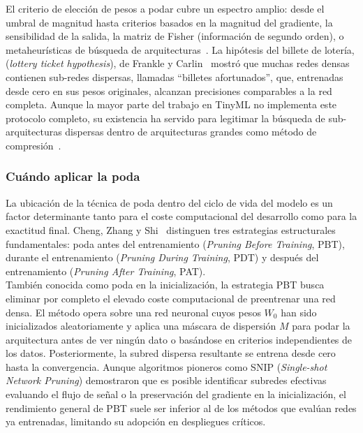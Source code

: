 \documentclass[a4paper,12pt,twoside,final]{book}
\begin{document}
El criterio de elección de pesos a podar cubre un espectro amplio: desde el umbral de magnitud hasta criterios
basados en la magnitud del gradiente, la sensibilidad de la salida, la matriz de Fisher (información de segundo
orden), o metaheurísticas de búsqueda de arquitecturas~\cite{liang2021neucom,cheng2024ieetpami}. La hipótesis del
billete de lotería, (\textit{lottery ticket hypothesis}), de Frankle y Carlin~\cite{frankle2019iclr} mostró que
muchas redes densas contienen sub-redes dispersas, llamadas ``billetes afortunados'', que, entrenadas desde cero en sus
pesos originales, alcanzan precisiones comparables a la red completa. Aunque la mayor parte del trabajo en TinyML no
implementa este protocolo completo, su existencia ha servido para legitimar la búsqueda de sub-arquitecturas
dispersas dentro de arquitecturas grandes como método de compresión~\cite{cheng2024ieetpami}.

\subsubsection{Cuándo aplicar la poda}
La ubicación de la técnica de poda dentro del ciclo de vida del modelo es un factor determinante tanto para el coste
computacional del desarrollo como para la exactitud final. Cheng, Zhang y Shi~\cite{cheng2024ieetpami} distinguen
tres estrategias estructurales fundamentales: poda antes del entrenamiento (\textit{Pruning Before Training}, PBT),
durante el entrenamiento (\textit{Pruning During Training}, PDT) y después del entrenamiento (\textit{Pruning After
Training}, PAT).\\

También conocida como poda en la inicialización, la estrategia PBT busca eliminar por completo el elevado coste
computacional de preentrenar una red densa. El método opera sobre una red neuronal cuyos pesos $W_0$ han sido
inicializados aleatoriamente y aplica una máscara de dispersión $M$ para podar la arquitectura antes de ver ningún
dato o basándose en criterios independientes de los datos. Posteriormente, la subred dispersa resultante se entrena
desde cero hasta la convergencia. Aunque algoritmos pioneros como SNIP (\textit{Single-shot Network Pruning})
demostraron que es posible identificar subredes efectivas evaluando el flujo de señal o la preservación del gradiente
en la inicialización, el rendimiento general de PBT suele ser inferior al de los métodos que evalúan redes ya
entrenadas, limitando su adopción en despliegues críticos.\\
\end{document}
